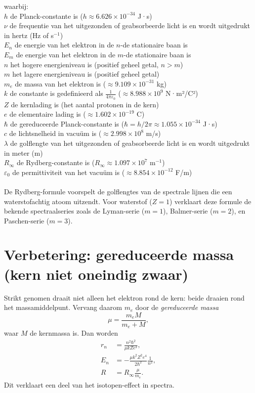 \documentclass{report} %
\begin{document}
    waarbij:\\
    $h$ de Planck-constante is ($h \approx 6.626 \times 10^{-34}$ J·s)\\
    $\nu$ de frequentie van het uitgezonden of geabsorbeerde licht is en wordt uitgedrukt in hertz (Hz of s$^{-1}$)\\
    $E_n$ de energie van het elektron in de $n$-de stationaire baan is\\
    $E_m$ de energie van het elektron in de $m$-de stationaire baan is\\
    $n$ het hogere energieniveau is (positief geheel getal, $n > m$)\\
    $m$ het lagere energieniveau is (positief geheel getal)\\
    $m_e$ de massa van het elektron is ($\approx 9.109 \times 10^{-31}$ kg)\\
    $k$ de constante is gedefinieerd als $\frac{1}{4\pi\varepsilon_0}$ ($\approx 8.988 \times 10^9$ N·m²/C²)\\
    $Z$ de kernlading is (het aantal protonen in de kern)\\
    $e$ de elementaire lading is ($\approx 1.602 \times 10^{-19}$ C)\\
    $\hbar$ de gereduceerde Planck-constante is ($\hbar = h/2\pi \approx 1.055 \times 10^{-34}$ J·s)\\
    $c$ de lichtsnelheid in vacuüm is ($\approx 2.998 \times 10^8$ m/s)\\
    $\lambda$ de golflengte van het uitgezonden of geabsorbeerde licht is en wordt uitgedrukt in meter (m)\\
    $R_\infty$ de Rydberg-constante is ($R_\infty \approx 1.097 \times 10^7$ m$^{-1}$)\\
    $\varepsilon_0$ de permittiviteit van het vacuüm is ($\approx 8.854 \times 10^{-12}$ F/m)\\
    \\
    De Rydberg-formule voorspelt de golflengtes van de spectrale lijnen die een waterstofachtig atoom uitzendt. Voor waterstof ($Z=1$) verklaart deze formule de bekende spectraalseries zoals de Lyman-serie ($m=1$), Balmer-serie ($m=2$), en Paschen-serie ($m=3$).


    \section{Verbetering: gereduceerde massa (kern niet oneindig zwaar)}
    Strikt genomen draait niet alleen het elektron rond de kern: beide draaien rond het massamiddelpunt.
    Vervang daarom $m_e$ door de \emph{gereduceerde massa}
    \[
        \mu = \frac{m_e M}{m_e+M},
    \]
    waar $M$ de kernmassa is. Dan worden
    \begin{align}
        r_n &= \frac{n^2\hbar^2}{\mu k Z e^2},
        \\
        E_n &= -\frac{\mu k^2 Z^2 e^4}{2\hbar^2}\frac{1}{n^2},
        \\
        R &= R_\infty\frac{\mu}{m_e}.
    \end{align}
    Dit verklaart een deel van het isotopen-effect in spectra.
\end{document}
